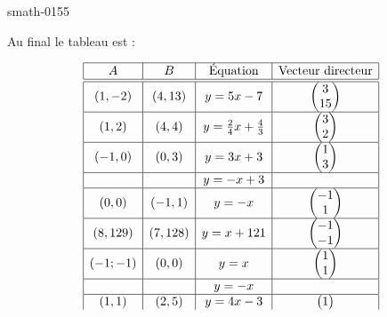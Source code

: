 \begin{corrige}{smath-0155}
\begin{enumerate}
    \end{enumerate}

    Au final le tableau est :

    \begin{equation*}
        \begin{array}[]{|c|c|c|c|}
            \hline
            A&B&\text{Équation}&\text{Vecteur directeur}\\
            \hline\hline
            (1,-2)&(4,13)&y=5x-7&\begin{pmatrix}
                3    \\ 
                15    
            \end{pmatrix}\\
            \hline
            (1,2)&(4,4)&y=\frac{ 2 }{ 4 }x+\frac{ 4 }{ 3 }&\begin{pmatrix}
                3    \\ 
                2    
            \end{pmatrix}\\
            \hline
            (-1,0)&(0,3)&y=3x+3&\begin{pmatrix}
                1    \\ 
                3    
            \end{pmatrix}\\
            \hline
            &&y=-x+3&\\
            \hline
            (0,0)&(-1,1)&y=-x&\begin{pmatrix}
                -1    \\ 
                1    
            \end{pmatrix}\\
            \hline
            (8,129)&(7,128)&y=x+121&\begin{pmatrix}
                -1    \\ 
                -1    
            \end{pmatrix}\\
            \hline
            (-1;-1)&(0,0)&y=x&\begin{pmatrix}
                1    \\ 
                1    
            \end{pmatrix}\\
            \hline
            &&y=-x&\\
            \hline
            (1,1)&(2,5)&y=4x-3&\begin{pmatrix}
                1    \\ 

\end{pmatrix}
\end{array}
\end{equation*}
\end{corrige}
